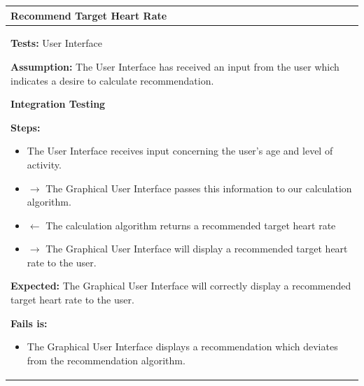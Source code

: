 \documentclass[letterpaper,english, 12pt]{scrreprt}
\begin{document}
\begin{center}
         \begin{tabular}{|C{15cm}|}
                 \hline
                        \textbf{Recommend Target Heart Rate} \\
                \hline
                        \begin{flushleft}
                                \textbf{Tests: } User Interface
                        \end{flushleft}
                        \begin{flushleft}
                                \textbf{Assumption: } The User Interface has received an input from the user which indicates a desire to calculate recommendation.
                        \end{flushleft}
			\begin{center}
				\textbf{Integration Testing}
			\end{center}
                        \begin{flushleft}
                                \textbf{Steps: }
                        \end{flushleft}
                                \begin{itemize}
                                        \item The User Interface receives input concerning the user's age and level of activity.
                                        \item $\rightarrow$ The Graphical User Interface passes this information to our calculation algorithm.
                                        \item $\leftarrow$ The calculation algorithm returns a recommended target heart rate
                                        \item $\rightarrow$ The Graphical User Interface will display a recommended target heart rate to the user.
                                \end{itemize}
                        \begin{flushleft}
                                \textbf{Expected: } The Graphical User Interface will correctly display a recommended target heart rate to the user.
                        \end{flushleft}
                        \begin{flushleft}
                                \textbf{Fails is: }
                        \end{flushleft}
                                \begin{itemize}
                                        \item The Graphical User Interface displays a recommendation which deviates from the recommendation algorithm.
                                \end{itemize}\\
                \hline
        \end{tabular}
\end{center}
\end{document}
